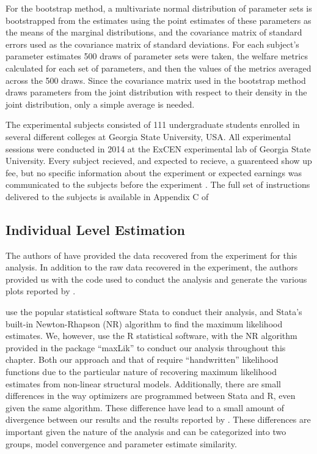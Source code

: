 \documentclass[../main.tex]{subfiles}
\begin{document}
For the bootstrap method, a multivariate normal distribution of parameter sets is bootstrapped from the estimates using the point estimates of these parameters as the means of the marginal distributions, and the covariance matrix of standard errors used as the covariance matrix of standard deviations.
For each subject's parameter estimates 500 draws of parameter sets were taken, the welfare metrics calculated for each set of parameters, and then the values of the metrics averaged across the 500 draws.
Since the covariance matrix used in the bootstrap method draws parameters from the joint distribution with respect to their density in the joint distribution, only a simple average is needed.

The experimental subjects consisted of 111 undergraduate students enrolled in several different colleges at Georgia State University, USA.
All experimental sessions were conducted in 2014 at the ExCEN experimental lab of Georgia State University. 
Every subject recieved, and expected to recieve, a guarenteed  show up fee, but no specific information about the experiment or expected earnings was communicated to the subjects before the experiment \parencite[98]{Harrison2016}.
The full set of instructions delivered to the subjects is available in Appendix C of \textcite{Harrison2016}

\subsection{Individual Level Estimation}

The authors of \textcite{Harrison2016} have provided the data recovered from the experiment for this analysis. 
In addition to the raw data recovered in the experiment, the authors provided us with the code used to conduct the analysis and generate the various plots reported by \textcite{Harrison2016}.

\textcite{Harrison2016} use the popular statistical software Stata to conduct their analysis, and Stata's built-in Newton-Rhapson (NR) algorithm to find the maximum likelihood estimates.
We, however, use the R statistical software, with the NR algorithm provided in the package \enquote{maxLik} to conduct our analysis throughout this chapter. {\footnotemark}
Both our approach and that of \textcite{Harrison2016} require \enquote{handwritten} likelihood functions due to the particular nature of recovering maximum likelihood estimates from non-linear structural models.
Additionally, there are small differences in the way optimizers are programmed between Stata and R, even given the same algorithm.
These difference have lead to a small amount of divergence between our results and the results reported by \textcite{Harrison2016}.
These differences are important given the nature of the analysis and can be categorized into two groups, model convergence and parameter estimate similarity.
\end{document}
